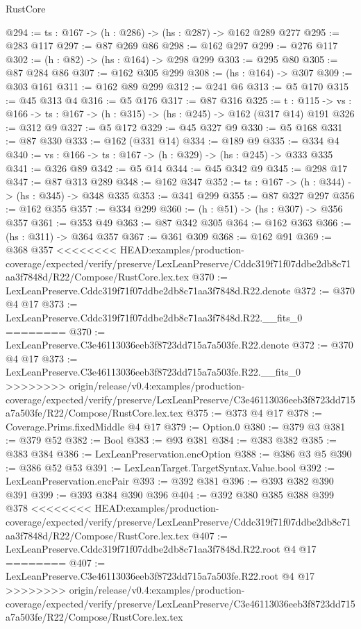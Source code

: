 \begin{lexlean}{RustCore}
\begin{coremodule}
{\begin{coremodule}
@294 := {ts : @167} -> (h : @286) -> (hs : @287) -> @162 @289 @277
@295 := @283 @117
@297 := @87 @269 @86
@298 := @162 @297
@299 := @276 @117
@302 := (h : @82) -> (hs : @164) -> @298 @299
@303 := @295 @80
@305 := @87 @284 @86
@307 := @162 @305 @299
@308 := (hs : @164) -> @307
@309 := @303 @161
@311 := @162 @89 @299
@312 := @241 @6
@313 := @5 @170
@315 := @45 @313 @4
@316 := @5 @176
@317 := @87 @316
@325 := {t : @115} ->
  {vs : @166} -> {ts : @167} -> (h : @315) -> (hs : @245) -> @162 (@317 @14) @191
@326 := @312 @9
@327 := @5 @172
@329 := @45 @327 @9
@330 := @5 @168
@331 := @87 @330
@333 := @162 (@331 @14)
@334 := @189 @9
@335 := @334 @4
@340 := {vs : @166} -> {ts : @167} -> (h : @329) -> (hs : @245) -> @333 @335
@341 := @326 @89
@342 := @5 @14
@344 := @45 @342 @9
@345 := @298 @17
@347 := @87 @313 @289
@348 := @162 @347
@352 := {ts : @167} -> (h : @344) -> (hs : @345) -> @348 @335
@353 := @341 @299
@355 := @87 @327 @297
@356 := @162 @355
@357 := @334 @299
@360 := (h : @51) -> (hs : @307) -> @356 @357
@361 := @353 @49
@363 := @87 @342 @305
@364 := @162 @363
@366 := (hs : @311) -> @364 @357
@367 := @361 @309
@368 := @162 @91
@369 := @368 @357
<<<<<<<< HEAD:examples/production-coverage/expected/verify/preserve/LexLeanPreserve/Cddc319f71f07ddbe2db8c71aa3f7848d/R22/Compose/RustCore.lex.tex
@370 := LexLeanPreserve.Cddc319f71f07ddbe2db8c71aa3f7848d.R22.denote
@372 := @370 @4 @17
@373 := LexLeanPreserve.Cddc319f71f07ddbe2db8c71aa3f7848d.R22.__fits_0
========
@370 := LexLeanPreserve.C3e46113036eeb3f8723dd715a7a503fe.R22.denote
@372 := @370 @4 @17
@373 := LexLeanPreserve.C3e46113036eeb3f8723dd715a7a503fe.R22.__fits_0
>>>>>>>> origin/release/v0.4:examples/production-coverage/expected/verify/preserve/LexLeanPreserve/C3e46113036eeb3f8723dd715a7a503fe/R22/Compose/RustCore.lex.tex
@375 := @373 @4 @17
@378 := Coverage.Prims.fixedMiddle @4 @17
@379 := Option.{0}
@380 := @379 @3
@381 := @379 @52
@382 := Bool
@383 := @93 @381
@384 := @383 @382
@385 := @383 @384
@386 := LexLeanPreservation.encOption
@388 := @386 @3 @5
@390 := @386 @52 @53
@391 := LexLeanTarget.TargetSyntax.Value.bool
@392 := LexLeanPreservation.encPair
@393 := @392 @381
@396 := @393 @382 @390 @391
@399 := @393 @384 @390 @396
@404 := @392 @380 @385 @388 @399 @378
<<<<<<<< HEAD:examples/production-coverage/expected/verify/preserve/LexLeanPreserve/Cddc319f71f07ddbe2db8c71aa3f7848d/R22/Compose/RustCore.lex.tex
@407 := LexLeanPreserve.Cddc319f71f07ddbe2db8c71aa3f7848d.R22.root @4 @17
========
@407 := LexLeanPreserve.C3e46113036eeb3f8723dd715a7a503fe.R22.root @4 @17
>>>>>>>> origin/release/v0.4:examples/production-coverage/expected/verify/preserve/LexLeanPreserve/C3e46113036eeb3f8723dd715a7a503fe/R22/Compose/RustCore.lex.tex

\end{coremodule}}
\end{coremodule}
\end{lexlean}
